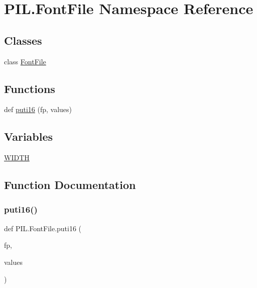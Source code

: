 \hypertarget{namespacePIL_1_1FontFile}{}\section{P\+I\+L.\+Font\+File Namespace Reference}
\label{namespacePIL_1_1FontFile}
\subsection*{Classes}
\begin{DoxyCompactItemize}
\item 
class \hyperlink{classPIL_1_1FontFile_1_1FontFile}{Font\+File}
\end{DoxyCompactItemize}
\subsection*{Functions}
\begin{DoxyCompactItemize}
\item 
def \hyperlink{namespacePIL_1_1FontFile_a07a6352925df28e85524160acd58ba3a}{puti16} (fp, values)
\end{DoxyCompactItemize}
\subsection*{Variables}
\begin{DoxyCompactItemize}
\item 
\hyperlink{namespacePIL_1_1FontFile_ada31ea014868fb49088ab57c6a8e17ce}{W\+I\+D\+TH}
\end{DoxyCompactItemize}


\subsection{Function Documentation}
\mbox{\label{namespacePIL_1_1FontFile_a07a6352925df28e85524160acd58ba3a}} 
\subsubsection{\texorpdfstring{puti16()}{puti16()}}
{\footnotesize\ttfamily def P\+I\+L.\+Font\+File.\+puti16 (\begin{DoxyParamCaption}\item[{}]{fp,  }\item[{}]{values }\end{DoxyParamCaption})}

